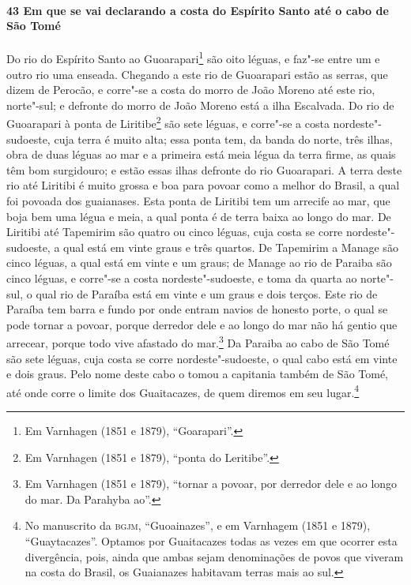 \begin{linenumbers}
\paragraph{43 Em que se vai declarando a costa do Espírito Santo até o cabo de São Tomé} \quad
Do rio do Espírito Santo ao Guoarapari\footnote{ Em Varnhagen (1851 e 1879),
``Goarapari''.} são oito léguas, e faz"-se entre um e outro rio uma enseada. Chegando a
este rio de Guoarapari estão as serras, que dizem de Perocão, e corre"-se a costa do morro
de João Moreno até este rio, norte"-sul; e defronte do morro de João Moreno está a ilha
Escalvada. Do rio de Guoarapari à ponta de Liritibe\footnote{ Em Varnhagen (1851 e 1879),
``ponta do Leritibe''.} são sete léguas, e corre"-se a costa nordeste"-sudoeste, cuja terra
é muito alta; essa ponta tem, da banda do norte, três ilhas, obra de duas léguas ao mar e
a primeira está meia légua da terra firme, as quais têm bom surgidouro; e estão essas
ilhas defronte do rio Guoarapari. A terra deste rio até Liritibi é muito grossa e boa para
povoar como a melhor do Brasil, a qual foi povoada dos guaianases. Esta ponta de Liritibi
tem um arrecife ao mar, que boja bem uma légua e meia, a qual ponta é de terra baixa ao
longo do mar. De Liritibi até Tapemirim são quatro ou cinco léguas, cuja costa se corre
nordeste"-sudoeste, a qual está em vinte graus e três quartos. De Tapemirim a Manage são
cinco léguas, a qual está em vinte e um graus; de Manage ao rio de Paraiba são cinco
léguas, e corre"-se a costa nordeste"-sudoeste, e toma da quarta ao norte"-sul, o qual rio de
Paraíba está em vinte e um graus e dois terços. Este rio de Paraíba tem barra e fundo por
onde entram navios de honesto porte, o qual se pode tornar a povoar, porque derredor dele
e ao longo do mar não há gentio que arrecear, porque todo vive afastado do mar.\footnote{
Em Varnhagen (1851 e 1879), ``tornar a povoar, por derredor dele e ao longo do mar. Da
Parahyba ao''.} Da Paraiba ao cabo de São Tomé são sete léguas, cuja costa se corre
nordeste"-sudoeste, o qual cabo está em vinte e dois graus. Pelo nome deste cabo o tomou a
capitania também de São Tomé, até onde corre o limite dos Guaitacazes, de quem diremos em
seu lugar.\footnote{ No manuscrito da \textsc{bgjm}, ``Guoainazes'', e em Varnhagem (1851
e 1879), ``Guaytacazes''. Optamos por Guaitacazes todas as vezes em que ocorrer esta
divergência, pois, ainda que ambas sejam denominações de povos que viveram na costa do
Brasil, os Guaianazes habitavam terras mais ao sul.}


\end{linenumbers}

